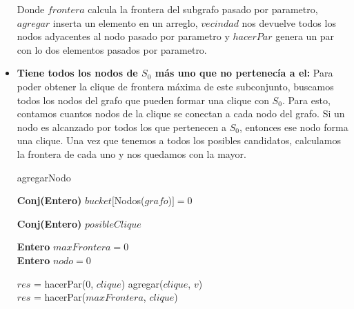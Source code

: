 \begin{itemize}
Donde $frontera$ calcula la frontera del subgrafo pasado por parametro, $agregar$ inserta un elemento en un arreglo, $vecindad$ nos devuelve todos los nodos adyacentes al nodo pasado por parametro y $hacerPar$ genera un par con lo dos elementos pasados por parametro. \newline


\item \textbf{Tiene todos los nodos de $S_{0}$ más uno que no pertenecía a el:} \newline
Para poder obtener la clique de frontera máxima de este subconjunto, buscamos todos los nodos del grafo que pueden formar una clique con $S_{0}$. Para esto, contamos cuantos nodos de la clique se conectan a cada nodo del grafo. Si un nodo es alcanzado por todos los que pertenecen a $S_{0}$, entonces ese nodo forma una clique. Una vez que tenemos a todos los posibles candidatos, calculamos la frontera de cada uno y nos quedamos con la mayor. \newline

\begin{algorithm}[H]
    \SetAlgoLined
    \caption{agregarNodo}
	
    \textbf{Conj(Entero)} $bucket[$Nodos($grafo$)$] = 0$  \\
	

	
    \textbf{Conj(Entero)} $posibleClique$ \\

    \textbf{Entero} $maxFrontera = 0$ \\
    \textbf{Entero} $nodo = 0$ \\



	{$res$ = hacerPar(0, $clique$)}
    {	agregar($clique$, $v$) \\
	$res$ = hacerPar($maxFrontera$, $clique$) }


\end{algorithm}
\end{itemize}
